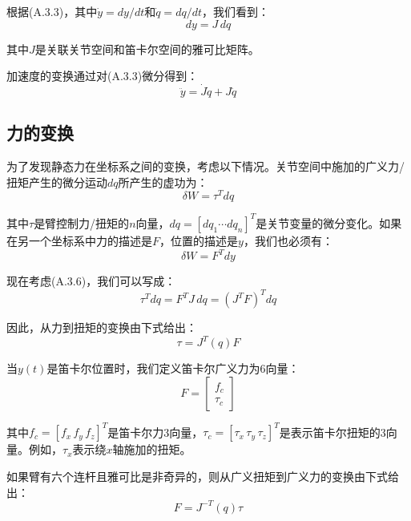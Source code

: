 \documentclass[UTF8,a4paper]{ctexart}
\begin{document}
根据(A.3.3)，其中$\dot{y} = dy/dt$和$\dot{q} = dq/dt$，我们看到：
\begin{equation}
dy = J \, dq
\tag{A.3.6}
\end{equation}

其中$J$是关联关节空间和笛卡尔空间的雅可比矩阵。

加速度的变换通过对(A.3.3)微分得到：
\begin{equation}
\ddot{y} = \dot{J}\dot{q} + J\ddot{q}
\tag{A.3.7}
\end{equation}

\subsection{力的变换}

为了发现静态力在坐标系之间的变换，考虑以下情况。关节空间中施加的广义力/扭矩产生的微分运动$dq$所产生的虚功为：
\begin{equation}
\delta W = \tau^T dq
\tag{A.3.8}
\end{equation}

其中$\tau$是臂控制力/扭矩的$n$向量，$dq = [dq_1 \cdots dq_n]^T$是关节变量的微分变化。如果在另一个坐标系中力的描述是$F$，位置的描述是$y$，我们也必须有：
\begin{equation}
\delta W = F^T dy
\tag{A.3.9}
\end{equation}

现在考虑(A.3.6)，我们可以写成：
\begin{equation}
\tau^T dq = F^T J \, dq = (J^T F)^T dq
\end{equation}

因此，从力到扭矩的变换由下式给出：
\begin{equation}
\tau = J^T(q) F
\tag{A.3.10}
\end{equation}

当$y(t)$是笛卡尔位置时，我们定义笛卡尔广义力为6向量：
\begin{equation}
F = \begin{bmatrix} f_c \\ \tau_c \end{bmatrix}
\tag{A.3.11}
\end{equation}

其中$f_c = [f_x \, f_y \, f_z]^T$是笛卡尔力3向量，$\tau_c = [\tau_x \, \tau_y \, \tau_z]^T$是表示笛卡尔扭矩的3向量。例如，$\tau_x$表示绕$x$轴施加的扭矩。

如果臂有六个连杆且雅可比是非奇异的，则从广义扭矩到广义力的变换由下式给出：
\begin{equation}
F = J^{-T}(q)\tau
\tag{A.3.12}
\end{equation}
\end{document}
